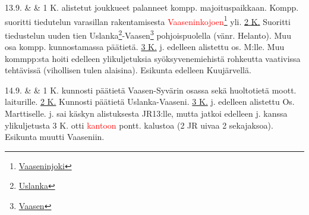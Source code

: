 \documentclass[11pt,a5paper,oneside]{book}
\begin{document}
13.9. & & 1 K. alistetut joukkueet palanneet kompp. majoituspaikkaan. Kompp. suoritti tiedutelun varasillan rakentamisesta \textcolor{red}{Vaaseninkojoen}\footnote{\href{https://www.google.fi/maps/place/Reka+Vazhinka/@60.9717912,34.0093844,5359m/}{Vaaseninjoki}} yli. \newline\newline \underline{2 K.} Suoritti tiedustelun uuden tien Uslanka\footnote{\href{https://www.google.fi/maps/place/6\%C2\%B058'32.7\%22N+33\%C2\%B054'02.8\%22E/@60.976793,33.8997559,17z/}{Uslanka}}-Vaasen\footnote{\href{https://www.google.fi/maps/place/Vaaseni,+Leningradin+alue,+Ven\%C3\%A4j\%C3\%A4,+187742/@60.9621216,34.0129134,15z/}{Vaasen}} pohjoispuolella (vänr. Helanto). Muu osa kompp. kunnostamassa päätietä. \newline\newline \underline{3 K.}  j. edelleen alistettu os. M:lle. Muu kommpp:sta hoiti edelleen ylikuljetuksia syöksyvenemiehistä rohkeutta vaativissa tehtävissä (vihollisen tulen alaisina).  \newline\newline Esikunta edelleen Kuujärvellä. \\

\newpage

14.9. & & 1 K. kunnosti päätietä Vaasen-Syvärin osassa sekä huoltotietä moott. laiturille. \newline\newline \underline{2 K.} Kunnosti päätietä Uslanka-Vaaseni. \newline\newline \underline{3 K.}  j. edelleen alistettu Os. Marttiselle.  j. sai käskyn alistuksesta JR13:lle, mutta jatkoi edelleen  j. kanssa ylikuljetusta 3 K. otti \textcolor{red}{kantoon} pontt. kalustoa (2 JR uivaa 2 sekajaksoa). Esikunta muutti Vaaseniin. \\

\taulustop

\end{document}
